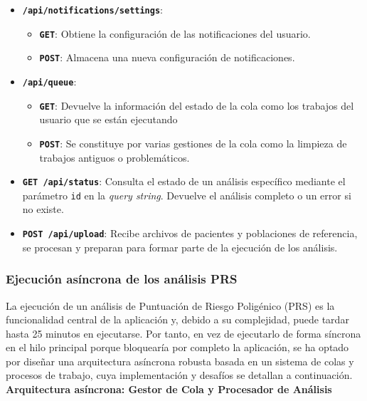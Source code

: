 \begin{itemize}
    \item \textbf{\texttt{/api/notifications/settings}}:
        \begin{itemize}
            \item \textbf{\texttt{GET}}: Obtiene la configuración de las notificaciones del usuario.
            \item \textbf{\texttt{POST}}: Almacena una nueva configuración de notificaciones.
        \end{itemize}

    \item \textbf{\texttt{/api/queue}}:
        \begin{itemize}
            \item \textbf{\texttt{GET}}: Devuelve la información del estado de la cola como los trabajos del usuario que se están ejecutando
            \item \textbf{\texttt{POST}}: Se constituye por varias gestiones de la cola como la limpieza de trabajos antiguos o problemáticos.
        \end{itemize}
    
    \item \textbf{\texttt{GET /api/status}}: Consulta el estado de un análisis específico mediante el parámetro \texttt{id} en la \textit{query string}. Devuelve el análisis completo o un error si no existe.

    \item \textbf{\texttt{POST /api/upload}}: Recibe archivos de pacientes y poblaciones de referencia, se procesan y preparan para formar parte de la ejecución de los análisis.
\end{itemize}

\subsubsection{Ejecución asíncrona de los análisis PRS}

La ejecución de un análisis de Puntuación de Riesgo Poligénico (PRS) es la funcionalidad central de la aplicación y, debido a su complejidad, puede tardar hasta 25 minutos en ejecutarse. Por tanto, en vez de ejecutarlo de forma síncrona en el hilo principal porque bloquearía por completo la aplicación, se ha optado por diseñar una arquitectura asíncrona robusta basada en un sistema de colas y procesos de trabajo, cuya implementación y desafíos se detallan a continuación.\\

\textbf{Arquitectura asíncrona: Gestor de Cola y Procesador de Análisis}


